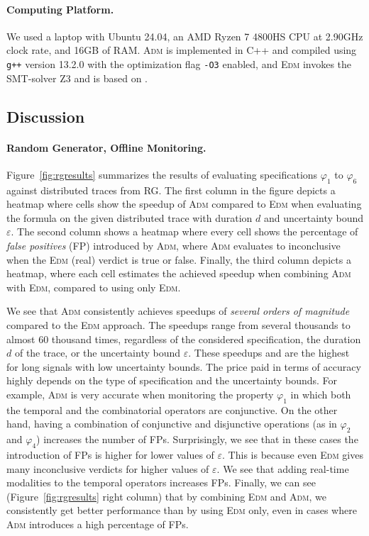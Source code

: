\documentclass[iicol,lineno]{sn-jnl}
\newcommand{\?}{\text{?}}
\begin{document}
		\paragraph*{Computing Platform.}
		We used a laptop with Ubuntu 24.04, an AMD Ryzen 7 4800HS CPU at 2.90GHz clock rate, and 16GB of RAM.
		\textsc{Adm} is implemented in C++ and compiled using \texttt{g++} version 13.2.0 with the optimization flag \texttt{-O3} enabled, and \textsc{Edm} invokes the SMT-solver Z3 \cite{MouraB08} and is based on \cite{MomtazAB23}.
		
		\subsection{Discussion}	
		
		\paragraph*{Random Generator, Offline Monitoring.}
		Figure~\ref{fig:rgresults} summarizes the results of evaluating specifications $\varphi_1$ to $\varphi_6$ against distributed traces from RG.
		The first column in the figure depicts a heatmap where cells show the speedup of \textsc{Adm} compared to \textsc{Edm} when evaluating the formula on the given distributed trace with duration $d$ and uncertainty bound $\varepsilon$.
		The second column shows a heatmap where every cell shows the percentage of \emph{false positives} (FP) introduced by \textsc{Adm}, where \textsc{Adm} evaluates to inconclusive when the \textsc{Edm} (real) verdict is true or false.
		Finally, the third column depicts a heatmap, where each cell estimates the achieved speedup when combining \textsc{Adm} with \textsc{Edm}, compared to using only \textsc{Edm}.
		
		
		We see that \textsc{Adm} consistently achieves speedups of \emph{several orders of magnitude} 
		compared to the \textsc{Edm} approach.
		The speedups range from several thousands to almost 60 thousand times, regardless of the considered specification, the duration $d$ of the trace, or the uncertainty bound $\varepsilon$.
		These speedups and are the highest for long signals with low uncertainty bounds.
		The price paid in terms of accuracy highly depends on the type of specification and the uncertainty bounds.
		For example, \textsc{Adm} is very accurate when monitoring the property $\varphi_1$ in which both the temporal and the combinatorial operators are conjunctive.
		On the other hand, having a combination of conjunctive and disjunctive operations (as in $\varphi_{2}$ and $\varphi_{4}$) increases the number of FPs.
		Surprisingly, we see that in these cases the introduction of FPs is higher for lower values of $\varepsilon$.
		This is because even \textsc{Edm} gives many inconclusive verdicts for higher values of $\varepsilon$.
		We see that adding real-time modalities to the temporal operators increases FPs.
		Finally, we can see (Figure~\ref{fig:rgresults} right column) that by combining \textsc{Edm} and \textsc{Adm}, we consistently get better performance than by using \textsc{Edm} only, even in cases where \textsc{Adm} introduces a high percentage of FPs.
		
\end{document}
